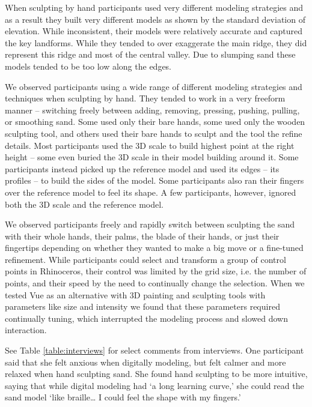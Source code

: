 When sculpting by hand 
participants used very different modeling strategies 
and as a result they built very different models
as shown by the standard deviation of elevation.
While inconsistent, 
their models were relatively accurate
and captured the key landforms.
While they tended to over exaggerate the main ridge, 
they did represent
this ridge and most of the central valley.
Due to slumping sand
these models tended to be too low along the edges. 

We observed participants using 
a wide range of different modeling strategies
and techniques when sculpting by hand. 
They tended to work in a very freeform manner 
-- switching freely between
adding, removing, pressing, pushing, pulling, or smoothing
sand. 
Some used only their bare hands, 
some used only the wooden sculpting tool,
and others used their bare hands to sculpt 
and the tool the refine details. 
Most participants used the 3D scale
to build highest point at the right height
-- some even buried the 3D scale in their model
building around it. 
%
Some participants instead 
picked up the reference model
and used its edges -- its profiles -- to build 
the sides of the model. 
Some participants also ran their fingers 
over the reference model to feel its shape.
A few  participants, however,
ignored both the 3D scale
and the reference model. 

We observed participants 
freely and rapidly switch between 
sculpting the sand with 
their whole hands,
their palms,
the blade of their hands, 
or just their fingertips 
depending on whether 
they wanted to make a big move
or a fine-tuned refinement.
%
While participants could select and transform
a group of control points in Rhinoceros,
their control was limited by the grid size, i.e. the number of points,
and their speed by the need to continually change the selection.
%
When we tested Vue as an alternative
with 3D painting and sculpting tools
with parameters like size and intensity
we found that these parameters 
required continually tuning,
which interrupted the modeling process 
and slowed down interaction.

See Table \ref{table:interviews} for select comments from interviews.
One participant said that she felt anxious when digitally modeling,
but felt calmer and more relaxed when hand sculpting sand. 
She found hand sculpting to be more intuitive, saying that
while digital modeling had `a long learning curve,' 
she could read the sand model `like braille\ldots 
I could feel the shape with my fingers.'

